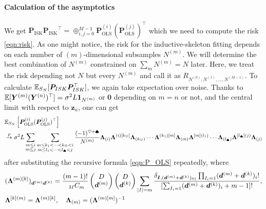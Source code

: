 \documentclass{article}
\begin{document}
\paragraph{Calculation of the asymptotics}
We get ${\bm P_\mathrm{ISK}} {\bm P_\mathrm{ISK}}^\top
=
\oplus_{i, j=0}^{M-1}
{\bm P}^{(i)}_\mathrm{OLS}
({\bm P}^{(j)}_\mathrm{OLS})^\top
$ which we need to compute the risk \cref{eqn:risk}.
%
As one might notice, the risk for the inductive-skeleton fitting depends on each number of $(m)$-dimensional subsamples $N^{(m)}$.
We will determine the best combination of $N^{(m)}$ constrained on $\sum_m N^{(m)} = N$ later.
Here, we treat the risk depending not $N$ but every $N^{(m)}$ and call it as
$
R_{N^{(0)}, N^{(1)}, \dots, N^{(M-1)}}
$.
%
To calculate $\mathbb{E}_{S_N} [\bm P_{ISK} \bm P_{ISK}^\top]$, we again take expectation over noise.
Thanks to $\mathbb{E} [\bm Y^{(m)} (\bm Y^{(n)})^\top ] = \sigma^2 L \bm 1_{N^{(m)}}$ or $\bm 0$ depending on $m=n$ or not, and the central limit with respect to $\bm z_n$, one can get
\begin{align}
&\mathbb{E}_{ S_N }
\left[
{\bm P}^{(i)}_\mathrm{OLS}
({\bm P}^{(j)}_\mathrm{OLS})^\top
 \right]
\notag \\
&\overset{p}{\to}
\sigma^2 L
\sum_{
\substack{
m \leq i
\\
m \leq j
}}
\sum_{
\substack{
m \leq k_1 < \dots < k_{\heartsuit} < i
\\
m \leq l_1 < \dots < l_{\spadesuit} < j
}
}
\frac{(-1)^{\heartsuit + \spadesuit}}{N^{(m)}}
{\bm \Lambda}_{(i)}
{\bm \Lambda}^{(i)[k_{\heartsuit}]}
{\bm \Lambda}_{(k_{\heartsuit} )}
\cdots
{\bm \Lambda}^{(k_1)[m]}
{\bm \Lambda}_{(m)}
{\bm \Lambda}^{[m](l_1)}
\cdots
{\bm \Lambda}_{(l_{\spadesuit} )}
{\bm \Lambda}^{[l_{\spadesuit}](j)}
{\bm \Lambda}_{(j)}
\label{eqn:P_OLS-P_OLS}
\end{align}
after substituting the recursive formula \cref{eqn:P_OLS} repeatedly, where
\begin{align}
&({\bm \Lambda}^{(m)[k]})_{ \bm d ^{(m)} \bm d ^{(k)} }
= %
\frac{(m-1)!}{\ _{M} C_m}
\begin{pmatrix}
D \\
{\bm d}^{(m)}
\end{pmatrix}
%
\begin{pmatrix}
D \\
{\bm d}^{(k)}
\end{pmatrix}
%
\sum_{ \card{I} = m }
\frac{
\delta_{{\bm I}, (\bm d ^{(m)} +  \bm d ^{(k)} )_{01} }
\prod_{I_i = 1}( \bm d ^{(m)} +  \bm d ^{(k)}  )_i !}{
[\sum_{I_i = 1} ( \bm d ^{(m)} +  \bm d ^{(k)}  )_i 
+ m - 1]!
},
\notag
\\
&
{\bm \Lambda}^{[k](m)}
=
{\bm \Lambda}^{(m)[k]},
\quad
{\bm \Lambda}_{(m)}
= 
({\bm \Lambda}^{(m)[m]})^{-1}
\label{eqn:Lamb}
\end{align}
\end{document}
